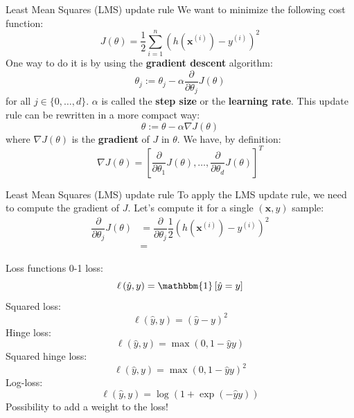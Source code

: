 \documentclass{beamer}
\newcommand{\bxi}{\bm{x}^{(i)}}
\newcommand{\bx}{\bm{x}}
\newcommand{\yi}{y^{(i)}}
\newcommand{\1}[1]{\mathbbm{1}\left[#1\right]}
\begin{document}
\begin{frame}{Least Mean Squares (LMS) update rule}
We want to minimize the following cost function:
\begin{equation*}
J(\theta) = \dfrac{1}{2} \sum_{i = 1}^{n} \left( h\left(\bxi\right) - \yi \right)^2
\end{equation*}
One way to do it is by using the \textbf{gradient descent} algorithm:
\begin{equation*}
\theta_j := \theta_j - \alpha \dfrac{\partial}{\partial \theta_j} J(\theta)
\end{equation*}
for all $j \in \{ 0, \dots, d\}$. $\alpha$ is called the \textbf{step size} or the \textbf{learning rate}. This update rule can be rewritten in a more compact way:
\begin{equation*}
\theta := \theta - \alpha \nabla J(\theta)
\end{equation*}
where $\nabla J(\theta)$ is the \textbf{gradient} of $J$ in $\theta$. We have, by definition:
\begin{equation*}
\nabla J(\theta) = \left[ \dfrac{\partial}{\partial \theta_1} J(\theta), \dots, \dfrac{\partial}{\partial \theta_d} J(\theta) \right]^T
\end{equation*}
\end{frame}

\begin{frame}{Least Mean Squares (LMS) update rule}
To apply the LMS update rule, we need to compute the gradient of $J$. Let's compute it for a single $(\bx, y)$ sample:
\begin{equation*}
\begin{split}
\dfrac{\partial}{\partial \theta_j} J(\theta) & = \dfrac{\partial}{\partial \theta_j} \dfrac{1}{2} \left( h\left(\bxi\right) - \yi \right)^2\\
 & = 
\end{split}
\end{equation*}
\end{frame}

\begin{frame}{Loss functions}
0-1 loss:
$$ \ell \left( \hat{y}, y \right) = \1{\hat{y} = y}$$
\vfill
\pause
Squared loss:
$$ \ell \left( \hat{y}, y \right) = \left( \hat{y} - y\right)^2$$
\vfill
\pause
Hinge loss:
$$ \ell \left( \hat{y}, y \right) = \max\left(0, 1 - \hat{y} y\right)$$
\vfill
\pause
Squared hinge loss:
$$ \ell \left( \hat{y}, y \right) = \max\left(0, 1 - \hat{y} y\right)^2 $$
\vfill
\pause
Log-loss:
$$ \ell \left( \hat{y}, y \right) = \log \left( 1 + \exp ( - \hat{y}y )\right) $$
\vfill
\pause
Possibility to add a weight to the loss!

\end{frame}
\end{document}

